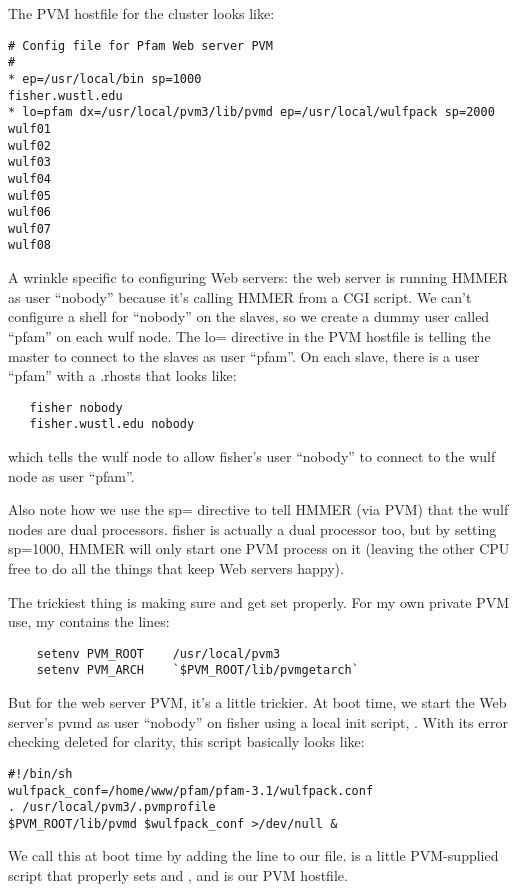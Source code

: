 The PVM hostfile for the cluster looks like:
\begin{verbatim}
# Config file for Pfam Web server PVM
#
* ep=/usr/local/bin sp=1000
fisher.wustl.edu
* lo=pfam dx=/usr/local/pvm3/lib/pvmd ep=/usr/local/wulfpack sp=2000
wulf01
wulf02
wulf03
wulf04
wulf05
wulf06
wulf07
wulf08
\end{verbatim}

A wrinkle specific to configuring Web servers: the web server is
running HMMER as user ``nobody'' because it's calling HMMER from a CGI
script. We can't configure a shell for ``nobody'' on the slaves, so we
create a dummy user called ``pfam'' on each wulf node.  The lo=
directive in the PVM hostfile is telling the master to connect to the
slaves as user ``pfam''. On each slave, there is a user ``pfam'' with
a .rhosts that looks like:
\begin{verbatim}
   fisher nobody
   fisher.wustl.edu nobody
\end{verbatim}
which tells the wulf node to allow fisher's user ``nobody'' 
to connect to the wulf node as user ``pfam''.

Also note how we use the sp= directive to tell HMMER (via PVM) that
the wulf nodes are dual processors. fisher is actually a dual
processor too, but by setting sp=1000, HMMER will only start one PVM
process on it (leaving the other CPU free to do all the things that
keep Web servers happy).

The trickiest thing is making sure  and
 get set properly.  For my own private PVM use, my
 contains the lines:
\begin{verbatim}
	setenv PVM_ROOT    /usr/local/pvm3
	setenv PVM_ARCH    `$PVM_ROOT/lib/pvmgetarch`
\end{verbatim}

But for the web server PVM, it's a little trickier. At boot time, we
start the Web server's pvmd as user ``nobody'' on fisher using a local
init script, . With its error
checking deleted for clarity, this script basically looks like:

\begin{verbatim}
#!/bin/sh
wulfpack_conf=/home/www/pfam/pfam-3.1/wulfpack.conf
. /usr/local/pvm3/.pvmprofile
$PVM_ROOT/lib/pvmd $wulfpack_conf >/dev/null &
\end{verbatim}

We call this at boot time by adding the line  to our 
file.  is a little PVM-supplied script that properly
sets  and , and 
is our PVM hostfile.

